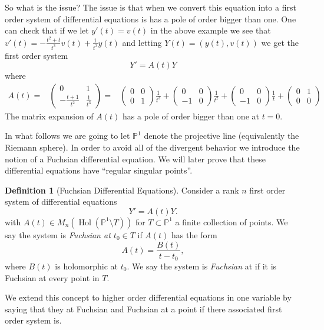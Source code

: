 \documentclass[]{book}
\numberwithin{equation}{section}
\theoremstyle{definition}
\newtheorem{definition}[theorem]{Definition}
\theoremstyle{remark}
\newcommand{\PP}{\mathbb{P}}
\newcommand{\hol}{\operatorname{Hol}}
\begin{document}
So what is the issue? 
The issue is that when we convert this equation into a first order system of differential equations is has a pole of order bigger than one. 
One can check that if we let $y'(t)=v(t)$ in the above example we see that  $v'(t) = -\frac{t^2+t}{t^3}v(t)+\frac{1}{t^3}y(t)$ and letting $Y(t) = (y(t),v(t))$ we get the first order system 
 $$ Y' =A(t) Y $$
where 
\begin{align*}
 A(t) =& 
\begin{pmatrix}
0 & 1 \\
-\frac{t+1}{t^2} & \frac{1}{t^3}
\end{pmatrix} 
=&
\begin{pmatrix}
0 & 0 \\
0 & 1
\end{pmatrix} \frac{1}{t^3}
+\begin{pmatrix}
0 & 0 \\
-1 & 0 
\end{pmatrix}\frac{1}{t^2}
+
\begin{pmatrix}
0 & 0 \\
-1 & 0 
\end{pmatrix}\frac{1}{t}
+
\begin{pmatrix}
0 & 1 \\
0 & 0  
\end{pmatrix}
\end{align*}
The matrix expansion of $A(t)$ has a pole of order bigger than one at $t=0$. 

In what follows we are going to let $\PP^1$ denote the projective line (equivalently the Riemann sphere). 
In order to avoid all of the divergent behavior we introduce the notion of a Fuchsian differential equation. 
We will later prove that these differential equations have ``regular singular points''.
\begin{definition}[Fuchsian Differential Equations]
Consider a rank $n$ first order system of differential equations 
\begin{equation}\label{E:first-order-system}
  Y' = A(t) Y. 
 \end{equation}
with $A(t) \in M_n(\hol(\PP^1\setminus T))$ for $T\subset \PP^1$ a finite collection of points. 
We say the system  is \emph{Fuchsian at $t_0 \in T$} if $A(t)$ has the form
		 $$ A(t) = \frac{B(t)}{t-t_0},$$
where $B(t)$ is  holomorphic at $t_0$. 
We say the system is \emph{Fuchsian} at if it is Fuchsian at every point in $T$. 
\end{definition}
We extend this concept to higher order differential equations in one variable by saying that they at Fuchsian and Fuchsian at a point if there associated first order system is. 
\end{document}

